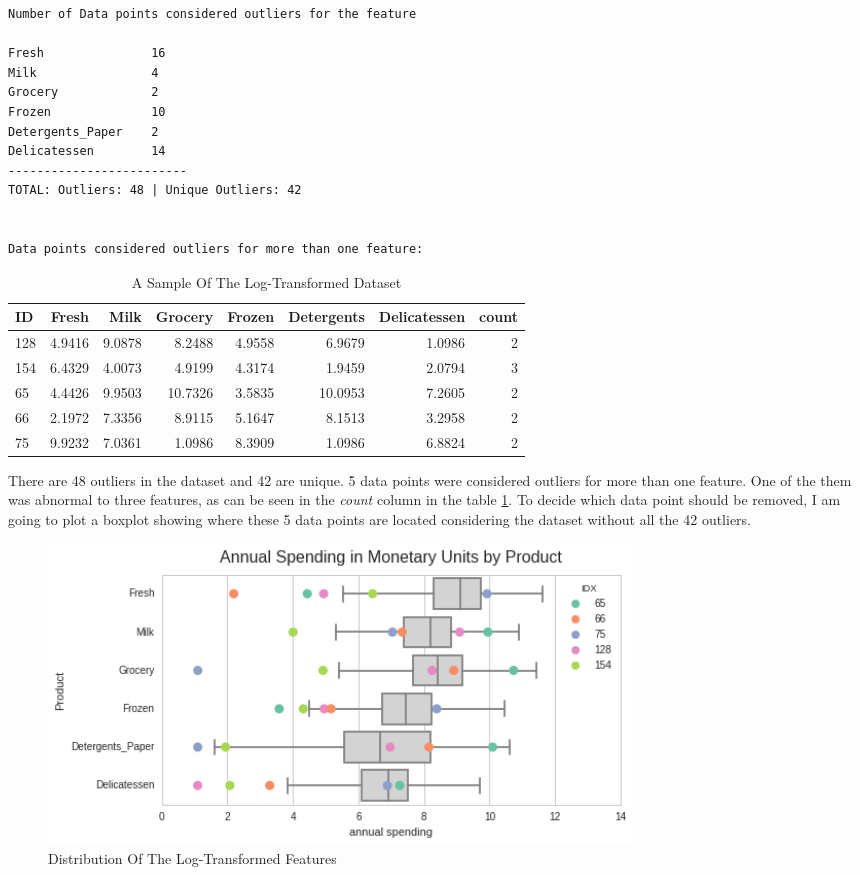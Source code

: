 \documentclass[a4paper]{article}
\begin{document}
\begin{lstlisting}
Number of Data points considered outliers for the feature

Fresh             	16                
Milk              	4                 
Grocery           	2                 
Frozen            	10                
Detergents_Paper  	2                 
Delicatessen      	14                
-------------------------
TOTAL: Outliers: 48 | Unique Outliers: 42


Data points considered outliers for more than one feature:
\end{lstlisting}

\begin{table}[ht!]
\centering
\begin{tabular}{l|rrrrrrr}
{ID} &    Fresh &     Milk &  Grocery &    Frozen & Detergents & Delicatessen & count \\\hline
128 &  4.9416 &  9.0878 &   8.2488 &  4.9558 &          6.9679 &      1.0986 &      2 \\
154 &  6.4329 &  4.0073 &   4.9199 &  4.3174 &          1.9459 &      2.0794 &      3 \\
65  &  4.4426 &  9.9503 &  10.7326 &  3.5835 &         10.0953 &      7.2605 &      2 \\
66  &  2.1972 &  7.3356 &   8.9115 &  5.1647 &          8.1513 &      3.2958 &      2 \\
75  &  9.9232 &  7.0361 &   1.0986 &  8.3909 &          1.0986 &      6.8824 &      2 \\

\end{tabular}
\caption{\label{tab:outliers}A Sample Of The Log-Transformed Dataset}
\end{table}

There are 48 outliers in the dataset and 42 are unique. 5 data points were considered outliers for more than one feature. One of the them was abnormal to three features, as can be seen in the \textit{count} column in the table \ref{tab:outliers}. To decide which data point should be removed, I am going to plot a boxplot showing where these 5 data points are located considering the dataset without all the 42 outliers.

\begin{figure}[ht!]
\centering
\includegraphics[width=0.75\textwidth]{figures/boxplot_features_log.png}
\caption{\label{fig:log_boxplot}Distribution Of The Log-Transformed Features}
\end{figure}
\end{document}
